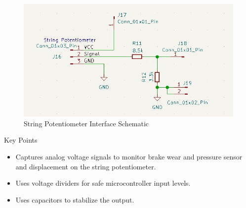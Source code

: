 \documentclass[8pt,compress,aspectratio=169]{beamer}
\begin{document}
\begin{frame}
\begin{minipage}{0.49\textwidth}
    \begin{figure}
      \includegraphics[width=\textwidth]{assets/electronic/string_pcb.jpg}
      \caption{String Potentiometer Interface Schematic}
    \end{figure}

    \vspace{-0.5cm}
    \begin{block}{Key Points}
      \begin{itemize}
        \item Captures analog voltage signals to monitor brake wear and pressure sensor and displacement on the string potentiometer.
        \item Uses voltage dividers for safe microcontroller input levels.
        \item Uses capacitors to stabilize the output.
      \end{itemize}
    \end{block}
  \end{minipage}
\end{frame}
\end{document}
